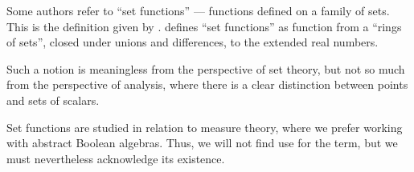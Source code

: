 \begin{remark}\label{rem:set_function}
  Some authors refer to \enquote{set functions} --- functions defined on a family of sets. This is the definition given by \textcite[30]{Halmos1976MeasureTheory}. \Textcite[def. 11.1]{Rudin1976AnalysisPrinciples} defines \enquote{set functions} as function from a \enquote{rings of sets}, closed under unions and differences, to the extended real numbers.

  Such a notion is meaningless from the perspective of set theory, but not so much from the perspective of analysis, where there is a clear distinction between points and sets of scalars.

  Set functions are studied in relation to measure theory, where we prefer working with abstract Boolean algebras. Thus, we will not find use for the term, but we must nevertheless acknowledge its existence.
\end{remark}

